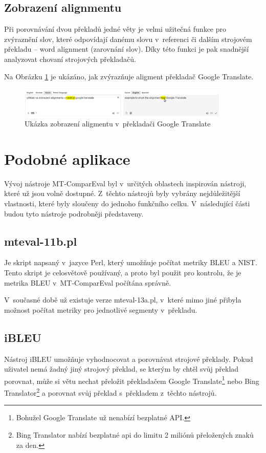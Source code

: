 \subsection{Zobrazení alignmentu}
Při porovnávání dvou překladů jedné věty je velmi užitečná funkce pro zvýraznění slov,
  které odpovídají danému slovu v~referenci či dalším strojovém překladu -- word alignment (zarovnání slov).
Díky této funkci je pak snadnější analyzovat chovaní strojových překladačů.

Na Obrázku \ref{img:alignment} je ukázáno, jak zvýrazňuje aligment překladač Google Translate.
\begin{figure}
	\center
	\includegraphics[width=0.9\textwidth]{img/alignment.eps}
	\caption{Ukázka zobrazení aligmentu v~překladači Google Translate}
	\label{img:alignment}
\end{figure}

\section{Podobné aplikace}
Vývoj nástroje MT-ComparEval byl v~určitých oblastech inspirován nástroji,
  které už jsou volně dostupné.
Z~těchto nástrojů byly vybrány nejdůležitější vlastnosti,
  které byly sloučeny do jednoho funkčního celku.
V~následující části budou tyto nástroje podrobněji představeny.

\subsection{mteval-11b.pl}
Je skript napsaný v~jazyce Perl,
  který umožňuje počítat metriky BLEU a NIST.
Tento skript je celosvětově používaný,
  a proto byl použit pro kontrolu,
  že je metrika BLEU v~MT-ComparEval počítána správně.

V~současné době už existuje verze mteval-13a.pl,
  v~které mimo jiné přibyla možnost počítat metriky pro jednotlivé segmenty v~překladu.

\subsection{iBLEU}
Nástroj iBLEU umožňuje vyhodnocovat a porovnávat strojové překlady.
Pokud uživatel nemá žadný jiný strojový překlad,
  se kterým by chtěl svůj překlad porovnat,
  může si větu nechat přeložit překladačem Google Translate\footnote{
    Bohužel Google Translate už nenabízí bezplatné API.
  } nebo Bing Translator\footnote{
    Bing Translator nabízí bezplatné api do limitu 2 miliónů přeložených znaků za den.
  }
  a porovnat svůj překlad s~překladem z~těchto nástrojů.

